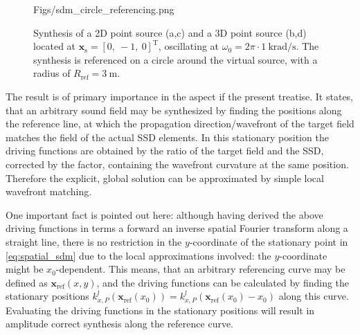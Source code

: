 \documentclass[12pt,a4paper]{article}
\newcommand{\vxref}{\mathbf{x}_{\mathrm{ref}}}
\newcommand{\vxs}{\mathbf{x}_{\mathrm{s}}}
\begin{document}
\begin{figure}
	\centering
	\begin{overpic}[width = .95\columnwidth ]{Figs/sdm_circle_referencing.png}
	\scriptsize
	\end{overpic}
	\caption{Synthesis of a 2D point source (a,c) and a 3D point source (b,d) located at $\vxs = [0,\ -1,\ 0]^\mathrm{T}$, oscillating at $\omega_0 = 2\pi \cdot 1 ~\mathrm{krad/s}$. The synthesis is referenced on a circle around the virtual source, with a radius of $R_{\mathrm{ref}} = 3~\mathrm{m}$.}
	\label{fig:sdm_spatial_1}
\end{figure}


The result is of primary importance in the aspect if the present treatise. It states, that an arbitrary sound field may be synthesized by finding the positions along the reference line, at which the propagation direction/wavefront of the target field matches the field of the actual SSD elements. In this stationary position the driving functions are obtained by the ratio of the target field and the SSD, corrected by the factor, containing the wavefront curvature at the same position. Therefore the explicit, global solution can be approximated by simple local wavefront matching.

One important fact is pointed out here: although having derived the above driving functions in terms a forward an inverse spatial Fourier transform along a straight line, there is no restriction in the $y$-coordinate of the stationary point in \eqref{eq:spatial_sdm} due to the local approximations involved: the $y$-coordinate might be $x_0$-dependent. This means, that an arbitrary referencing curve may be defined as $\vxref(x,y)$, and the driving functions can be calculated by finding the stationary positions $k_{x,P}^l(\vxref(x_0)) = k_{x,P}^l(\vxref(x_0) - x_0)$ along this curve. Evaluating the driving functions in the stationary positions will result in amplitude correct synthesis along the reference curve. 
\end{document}
